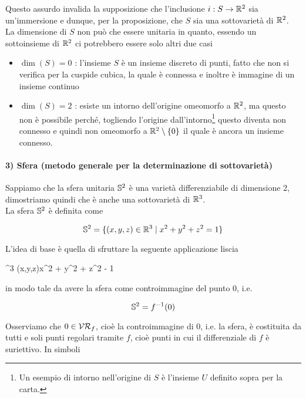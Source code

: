 Questo assurdo invalida la supposizione che l'inclusione $ i : S \to \R^{2} $ sia un'immersione e dunque, per la proposizione, che $ S $ sia una sottovarietà di $ \R^{2} $.\\
La dimensione di $ S $ non può che essere unitaria in quanto, essendo un sottoinsieme di $ \R^{2} $ ci potrebbero essere solo altri due casi

\begin{itemize}
	\item $ \dim(S)=0 $ : l'insieme $ S $ è un insieme discreto di punti, fatto che non si verifica per la cuspide cubica, la quale è connessa e inoltre è immagine di un insieme continuo
	
	\item $ \dim(S)=2 $ : esiste un intorno dell'origine omeomorfo a $ \R^{2} $, ma questo non è possibile perché, togliendo l'origine dall'intorno\footnote{%
		Un esempio di intorno nell'origine di $ S $ è l'insieme $ U $ definito sopra per la carta.%
	} questo diventa non connesso e quindi non omeomorfo a $ \R^{2} \setminus \{0\} $ il quale è ancora un insieme connesso.
\end{itemize}

\paragraph{3) Sfera (metodo generale per la determinazione di sottovarietà)}

Sappiamo che la sfera unitaria $ \S^{2} $ è una varietà differenziabile di dimensione 2, dimostriamo quindi che è anche una sottovarietà di $ \R^{3} $.\\
La sfera $ \S^{2} $ è definita come

\begin{equation}
	\S^{2} = \{ (x,y,z) \in \R^{3} \mid x^{2} + y^{2} + z^{2} = 1 \}
\end{equation}

L'idea di base è quella di sfruttare la seguente applicazione liscia

	{\R^{3}}{\R}
	{(x,y,z)}{x^{2} + y^{2} + z^{2} - 1}

in modo tale da avere la sfera come controimmagine del punto 0, i.e.

\begin{equation}
\S^{2} = f^{-1}(0)
\end{equation}

Osserviamo che $ 0 \in \VR_{f} $, cioè la controimmagine di 0, i.e. la sfera, è costituita da tutti e soli punti regolari tramite $ f $, cioè punti in cui il differenziale di $ f $ è suriettivo. In simboli

